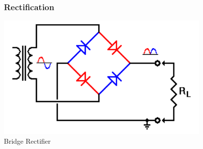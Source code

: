 \begin{frame}
\frametitle{Rectification}

\begin{center}
	\includegraphics[width=0.8\textwidth]{images/bridgerectifier.png}\\
	Bridge Rectifier~\cite{rectifier}
\end{center}

\end{frame}





